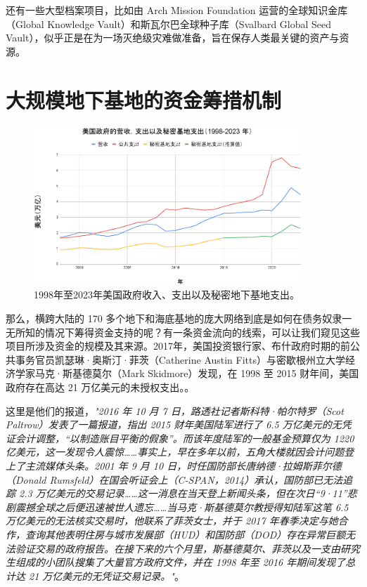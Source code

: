 \documentclass[10pt,twocolumn,letterpaper]{article}
\begin{document}
还有一些大型档案项目，比如由 Arch Mission Foundation 运营的全球知识金库（Global Knowledge Vault）\cite{29}和斯瓦尔巴全球种子库（Svalbard Global Seed Vault）\cite{30}，似乎正是在为一场灭绝级灾难做准备，旨在保存人类最关键的资产与资源。

\section{大规模地下基地的资金筹措机制}
\begin{figure}[t]
\begin{center}
\includegraphics[width=0.9\textwidth]{govchn.png}
\end{center}
   \caption{1998年至2023年美国政府收入、支出以及秘密地下基地支出\cite{19}。}
   \label{fig:9}
\end{figure}

那么，横跨大陆的 170 多个地下和海底基地的庞大网络到底是如何在债务奴隶一无所知的情况下筹得资金支持的呢？有一条资金流向的线索，可以让我们窥见这些项目所涉及资金的规模及其来源。2017年，美国投资银行家、布什政府时期的前公共事务官员凯瑟琳·奥斯汀·菲茨（Catherine Austin Fitts）与密歇根州立大学经济学家马克·斯基德莫尔（Mark Skidmore）发现，在 1998 至 2015 财年间，美国政府存在高达 21 万亿美元的未授权支出。\cite{11,12,13}。

这里是他们的报道，\textit{"2016 年 10 月 7 日，路透社记者斯科特·帕尔特罗（Scot Paltrow）发表了一篇报道，指出 2015 财年美国陆军进行了 6.5 万亿美元的无凭证会计调整，“以制造账目平衡的假象”。而该年度陆军的一般基金预算仅为 1220 亿美元，这一发现令人震惊……事实上，早在多年以前，五角大楼就因会计问题登上了主流媒体头条。2001 年 9 月 10 日，时任国防部长唐纳德·拉姆斯菲尔德（Donald Rumsfeld）在国会听证会上（C-SPAN，2014）承认，国防部已无法追踪 2.3 万亿美元的交易记录……这一消息在当天登上新闻头条，但在次日“9·11”悲剧震撼全球之后便迅速被世人遗忘……当马克·斯基德莫尔教授得知陆军这笔 6.5 万亿美元的无法核实交易时，他联系了菲茨女士，并于 2017 年春季决定与她合作，查询其他表明住房与城市发展部（HUD）和国防部（DOD）存在异常巨额无法验证交易的政府报告。在接下来的六个月里，斯基德莫尔、菲茨以及一支由研究生组成的小团队搜集了大量官方政府文件，并在 1998 年至 2016 年期间发现了总计达 21 万亿美元的无凭证交易记录。"}\cite{12}。
\end{document}
